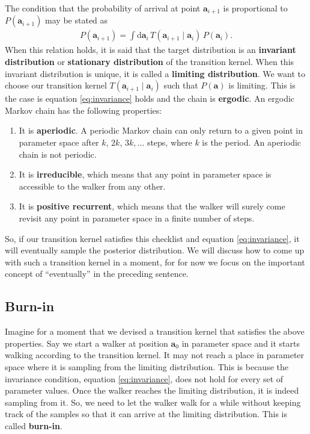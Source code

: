 The condition that the probability of arrival at
point $\mathbf{a}_{i+1}$ is proportional to $P(\mathbf{a}_{i+1})$ may
be stated as
\begin{align}
P(\mathbf{a}_{i+1}) = \int \mathrm{d}\mathbf{a}_i\, T(\mathbf{a}_{i+1}\mid \mathbf{a}_i)\,
P(\mathbf{a}_i).
\label{eq:invariance}
\end{align}
When this relation holds, it is said that the target distribution is
an \textbf{invariant distribution} or \textbf{stationary distribution}
of the transition kernel.  When this invariant distribution is unique,
it is called a \textbf{limiting distribution}.  We want to choose our
transition kernel $T(\mathbf{a}_{i+1}\mid \mathbf{a}_i)$ such that
$P(\mathbf{a})$ is limiting.  This is the case is equation
\eqref{eq:invariance} holds and the chain is \textbf{ergodic}.  An
ergodic Markov chain has the following properties:
\begin{enumerate}
\item It is \textbf{aperiodic}.  A periodic Markov chain can only
  return to a given point in parameter space after $k$, $2k$,
  $3k,\ldots$ steps, where $k$ is the period.  An aperiodic chain is
  not periodic.
\item It is \textbf{irreducible}, which means that any point in
  parameter space is accessible to the walker from any other.
\item It is \textbf{positive recurrent}, which means that the walker
  will surely come revisit any point in parameter space in a finite
  number of steps.
\end{enumerate}

So, if our transition kernel satisfies this checklist and equation
\eqref{eq:invariance}, it will eventually sample the posterior
distribution.  We will discuss how to come up with such a transition
kernel in a moment, for for now we focus on the important concept of
``eventually'' in the preceding sentence.

\subsection{Burn-in}
Imagine for a moment that we devised a transition kernel that
satisfies the above properties.  Say we start a walker at position
$\mathbf{a}_0$ in parameter space and it starts walking according to
the transition kernel.  It may not reach a place in parameter space
where it is sampling from the limiting distribution.  This is because
the invariance condition, equation \eqref{eq:invariance}, does not
hold for every set of parameter values.  Once the walker reaches the
limiting distribution, it is indeed sampling from it.  So, we need to
let the walker walk for a while without keeping track of the samples
so that it can arrive at the limiting distribution.  This is called
\textbf{burn-in}.

